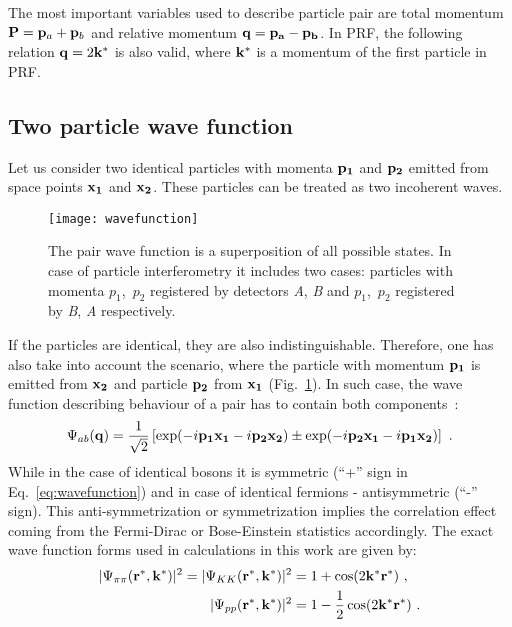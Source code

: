       The most important variables used to describe particle pair are total momentum $\mathbf{P} = \mathbf{p}_a + \mathbf{p}_b$ and relative momentum $\mathbf{q} = \mathbf{p_a} - \mathbf{p_b}$.
      In PRF, the following relation $\mathbf{q} = 2 \mathbf{k}^{*}$ is also valid, where $\mathbf{k}^{*}$ is a momentum of the first particle in PRF.

    \subsection{Two particle wave function}
      Let us consider two identical particles with momenta $\mathbf{p_1}$ and $\mathbf{p_2}$ emitted from space points $\mathbf{x_1}$ and $\mathbf{x_2}$.
      These particles can be treated as two incoherent waves.
      \begin{figure}[h]
        \centering
        \texttt{[image: wavefunction]}
        \caption{The pair wave function is a superposition of all possible states. In case of particle interferometry it includes two cases: particles with momenta $p_1$,~$p_2$ registered by detectors \textit{A}, \textit{B} and $p_1$,~$p_2$ registered by \textit{B}, \textit{A} respectively.}
        \label{fig:wavefunction}
      \end{figure}
      If the particles are identical, they are also indistinguishable.
      Therefore, one has also take into account the scenario, where the particle with momentum $\mathbf{p_1}$ is emitted from $\mathbf{x_2}$ and particle $\mathbf{p_2}$ from $\mathbf{x_1}$ (Fig.~\ref{fig:wavefunction}).
      In such case, the wave function describing behaviour of a pair has to contain both components~\cite{drkisiel}:
      \begin{equation}
      \label{eq:wavefunction}
        \Psi_{ab}(\mathbf{q})=\frac{1}{\sqrt{2}} \left[ \exp(- i \mathbf{p_1}\mathbf{x_1} - i \mathbf{p_2}\mathbf{x_2}) \pm \exp(- i \mathbf{p_2}\mathbf{x_1} - i \mathbf{p_1}\mathbf{x_2}) \right]~.
      \end{equation}
      While in the case of identical bosons it is symmetric (``+'' sign in Eq.~\ref{eq:wavefunction}) and in case of identical fermions - antisymmetric (``-'' sign).
      This anti-symmetrization or symmetrization implies the correlation effect coming from the Fermi-Dirac or Bose-Einstein statistics accordingly.
      The exact wave function forms used in calculations in this work are given by:
      \begin{align}
        \label{eq:pipi-wf}
        |\Psi_{\pi\pi}(\mathbf{r^*},\mathbf{k^*})|^2 = |\Psi_{KK}(\mathbf{r^*},\mathbf{k^*})|^2 &= 1 + \cos(2 \mathbf{k^*} \mathbf{r^*})~, \\
        \label{eq:pp-wf}
        |\Psi_{pp}(\mathbf{r^*},\mathbf{k^*})|^2 &= 1 - \frac{1}{2} \cos(2 \mathbf{k^*} \mathbf{r^*})~.
      \end{align}

